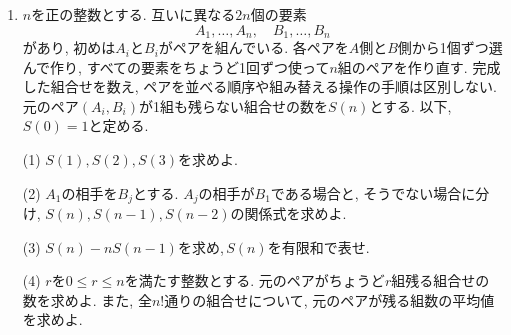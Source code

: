 \begin{enumerate}[label=\textbf{問\arabic*.},leftmargin=3.8em,format=\bookitemlink{practice-entrance}{problem}{answer}]
                \smallskip
                \noindent (3)~$(3,u_n,u_{n+1})$がすべての$n\ge0$について上の方程式の正の整数解となることを示せ.
                さらに, 異なる正の整数解が無限個あることを示し,
                $\displaystyle\lim_{n\to\infty}\frac{u_{n+1}}{u_n}$を求めよ.
                \par{}
          \item $n$を正の整数とする. 互いに異なる$2n$個の要素
                \[
                 A_1,\ldots,A_n,\quad B_1,\ldots,B_n
                \]
                があり, 初めは$A_i$と$B_i$がペアを組んでいる.
                各ペアを$A$側と$B$側から1個ずつ選んで作り, すべての要素をちょうど1回ずつ使って$n$組のペアを作り直す.
                完成した組合せを数え, ペアを並べる順序や組み替える操作の手順は区別しない.
                元のペア$(A_i,B_i)$が1組も残らない組合せの数を$S(n)$とする.
                以下,\,$S(0)=1$と定める.
                \par\smallskip
                (1) $S(1),S(2),S(3)$を求めよ.
                \par\smallskip
                (2) $A_1$の相手を$B_j$とする.
                $A_j$の相手が$B_1$である場合と, そうでない場合に分け,
                $S(n),S(n-1),S(n-2)$の関係式を求めよ.
                \par\smallskip
                (3) $S(n)-nS(n-1)$を求め,\,$S(n)$を有限和で表せ.
                \par\smallskip
                (4) $r$を$0\le r\le n$を満たす整数とする.
                元のペアがちょうど$r$組残る組合せの数を求めよ.
                また, 全$n!$通りの組合せについて, 元のペアが残る組数の平均値を求めよ.
                \par{}
        \end{enumerate}

